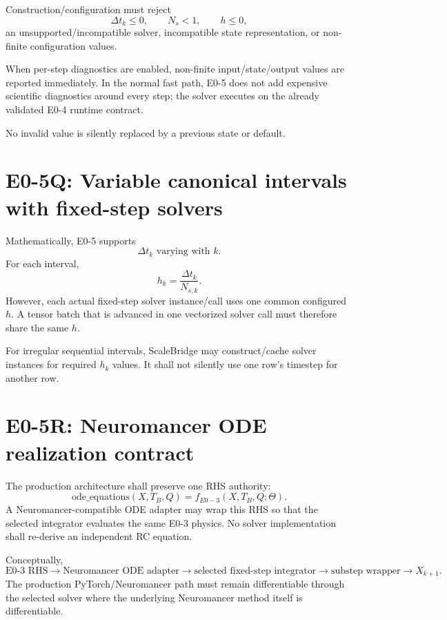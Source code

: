 \documentclass[11pt]{article}
\begin{document}
Construction/configuration must reject
\[
\Delta t_k\le0,
\qquad
N_s<1,
\qquad
h\le0,
\]
an unsupported/incompatible solver, incompatible state representation, or
non-finite configuration values.

When per-step diagnostics are enabled, non-finite input/state/output values are
reported immediately. In the normal fast path, E0-5 does not add expensive
scientific diagnostics around every step; the solver executes on the already
validated E0-4 runtime contract.

No invalid value is silently replaced by a previous state or default.

\section{E0-5Q: Variable canonical intervals with fixed-step solvers}

Mathematically, E0-5 supports
\[
\boxed{\Delta t_k\text{ varying with }k.}
\]
For each interval,
\[
h_k=\frac{\Delta t_k}{N_{s,k}}.
\]
However, each actual fixed-step solver instance/call uses one common configured
$h$. A tensor batch that is advanced in one vectorized solver call must therefore
share the same $h$.

For irregular sequential intervals, ScaleBridge may construct/cache solver
instances for required $h_k$ values. It shall not silently use one row's timestep
for another row.

\section{E0-5R: Neuromancer ODE realization contract}

The production architecture shall preserve one RHS authority:
\[
\boxed{
\mathrm{ode\_equations}(X,T_B,Q)
=
f_{E0-3}(X,T_B,Q;\Theta).
}
\]
A Neuromancer-compatible ODE adapter may wrap this RHS so that the selected
integrator evaluates the same E0-3 physics. No solver implementation shall
re-derive an independent RC equation.

Conceptually,
\[
\text{E0-3 RHS}
\to
\text{Neuromancer ODE adapter}
\to
\text{selected fixed-step integrator}
\to
\text{substep wrapper}
\to
X_{k+1}.
\]
The production PyTorch/Neuromancer path must remain differentiable through the
selected solver where the underlying Neuromancer method itself is differentiable.
\end{document}
